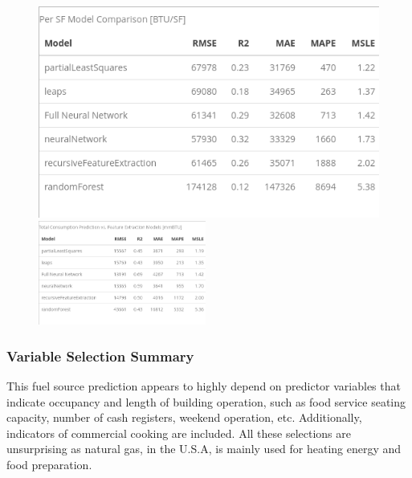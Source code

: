 \begin{figure}[h]
\centering
\includegraphics[width=.49\textwidth, height=0.25\textheight]{Images/natural_gas_psf_model_summary.png}
\includegraphics[width=0.49\textwidth, height=0.25\textheight]{Images/natural_gas_psf_model_summary_transformed.png}
\end{figure}

\subsubsection{Variable Selection Summary}
This fuel source prediction appears to highly depend on predictor variables that indicate occupancy and length of building operation, such as food service seating capacity, number of cash registers, weekend operation, etc.  Additionally, indicators of commercial cooking are included.  All these selections are unsurprising as natural gas, in the U.S.A, is mainly used for heating energy and food preparation. 

